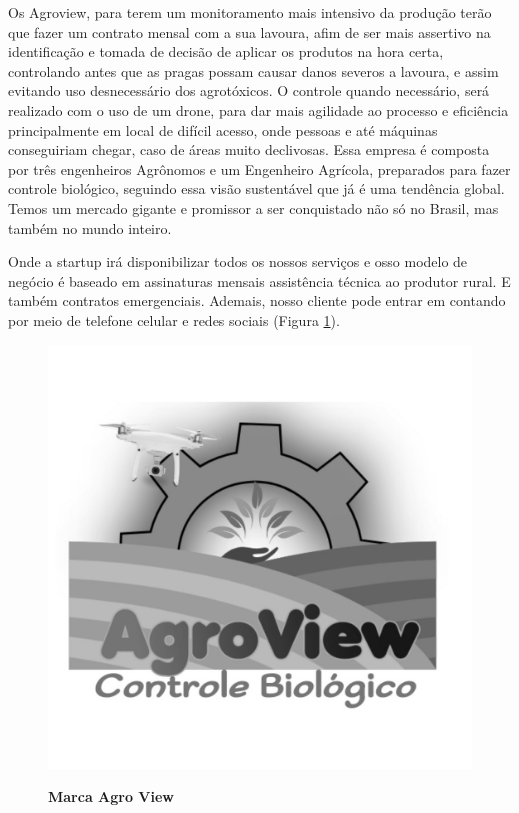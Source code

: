 Os Agroview, para terem um monitoramento mais intensivo da  produção terão que fazer um contrato mensal com a 
sua lavoura, afim de ser mais assertivo na identificação e tomada de decisão de aplicar os produtos  na hora certa, controlando antes que as pragas possam causar danos severos a lavoura, e assim  evitando uso desnecessário dos agrotóxicos. O controle quando necessário, será realizado com o uso de um drone, para dar mais agilidade ao processo e eficiência principalmente em local de difícil acesso, onde pessoas e até máquinas conseguiriam chegar, caso  de áreas muito declivosas. Essa empresa é composta por três engenheiros Agrônomos e um Engenheiro Agrícola, preparados para fazer controle biológico, seguindo  essa  visão sustentável que  já é uma tendência global. Temos um mercado gigante e promissor a ser  conquistado não só no Brasil, mas também no mundo inteiro.

Onde a startup irá disponibilizar todos os nossos serviços e  osso modelo de negócio é baseado em assinaturas mensais assistência técnica ao produtor rural. E também contratos emergenciais. Ademais, nosso cliente pode entrar em contando por meio de telefone celular e redes sociais (Figura \ref{figura_19}).


\begin{figure}[!htb]
\centering
\caption{\textbf{Marca Agro View}}
\includegraphics[scale=0.2]{Imagens/agroview.jpg}
\label{figura_19}
\end{figure}


